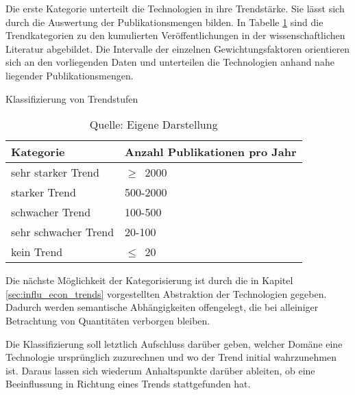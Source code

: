 Die erste Kategorie unterteilt die Technologien in ihre Trendstärke. Sie lässt sich durch die Auswertung der Publikationsmengen bilden. In Tabelle \ref{tab:class_trend_mt} sind die Trendkategorien zu den kumulierten Veröffentlichungen in der wissenschaftlichen Literatur abgebildet. Die Intervalle der einzelnen Gewichtungsfaktoren orientieren sich an den vorliegenden Daten und unterteilen die Technologien anhand nahe liegender Publikationsmengen.

\begin{table}
	\caption{Klassifizierung von Trendstufen}
	\selectfont
	\footnotesize
	\centering
	\label{tab:class_trend_mt}
	\begin{tabularx}{\linewidth}{XX}
		Kategorie & Anzahl Publikationen pro Jahr \\
		\hline
		sehr starker Trend & $\geq$~2000 \\
		starker Trend & 500-2000 \\
		schwacher Trend & 100-500 \\
		sehr schwacher Trend & 20-100 \\
		kein Trend & $\leq$~20 \\
	\end{tabularx}
	\caption*{Quelle: Eigene Darstellung}
\end{table}

Die nächste Möglichkeit der Kategorisierung ist durch die in Kapitel \ref{sec:influ_econ_trends} vorgestellten Abstraktion der Technologien gegeben. Dadurch werden semantische Abhängigkeiten offengelegt, die bei alleiniger Betrachtung von Quantitäten verborgen bleiben.

Die Klassifizierung soll letztlich Aufschluss darüber geben, welcher Domäne eine Technologie ursprünglich zuzurechnen und wo der Trend initial wahrzunehmen ist. Daraus lassen sich wiederum Anhaltspunkte darüber ableiten, ob eine Beeinflussung in Richtung eines Trends stattgefunden hat.
